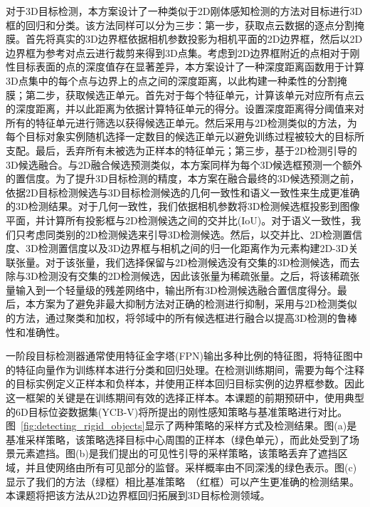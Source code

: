 \documentclass[12pt]{article}
\begin{document}
对于3D目标检测，本方案设计了一种类似于2D刚体感知检测的方法对目标进行3D框的回归和分类。该方法同样可以分为三步：第一步，获取点云数据的逐点分割掩膜。首先将真实的3D边界框依据相机参数投影为相机平面的2D边界框，然后以2D边界框为参考对点云进行裁剪来得到3D点集。考虑到2D边界框附近的点相对于刚性目标表面的点的深度值存在显著差异，本方案设计了一种深度距离函数用于计算3D点集中的每个点与边界上的点之间的深度距离，以此构建一种柔性的分割掩膜；第二步，获取候选正单元。首先对于每个特征单元，计算该单元对应所有点云的深度距离，并以此距离为依据计算特征单元的得分。设置深度距离得分阈值来对所有的特征单元进行筛选以获得候选正单元。然后采用与2D检测类似的方法，为每个目标对象实例随机选择一定数目的候选正单元以避免训练过程被较大的目标所支配。最后，丢弃所有未被选为正样本的特征单元；第三步，基于2D检测引导的3D候选融合。与2D融合候选预测类似，本方案同样为每个3D候选框预测一个额外的置信度。为了提升3D目标检测的精度，本方案在融合最终的3D候选预测之前，依据2D目标检测候选与3D目标检测候选的几何一致性和语义一致性来生成更准确的3D检测结果。对于几何一致性，我们依据相机参数将3D检测候选框投影到图像平面，并计算所有投影框与2D检测候选之间的交并比(IoU)。对于语义一致性，我们只考虑同类别的2D检测候选来引导3D检测候选。然后，以交并比、2D检测置信度、3D检测置信度以及3D边界框与相机之间的归一化距离作为元素构建2D-3D关联张量。对于该张量，我们选择保留与2D检测候选没有交集的3D检测候选，而去除与3D检测没有交集的2D检测候选，因此该张量为稀疏张量。之后，将该稀疏张量输入到一个轻量级的残差网络中，输出所有3D检测候选融合置信度得分。最后，本方案为了避免非最大抑制方法对正确的检测进行抑制，采用与2D检测类似的方法，通过聚类和加权，将邻域中的所有候选框进行融合以提高3D检测的鲁棒性和准确性。




一阶段目标检测器通常使用特征金字塔(FPN)输出多种比例的特征图，将特征图中的特征向量作为训练样本进行分类和回归处理。在检测训练期间，需要为每个注释的目标实例定义正样本和负样本，并使用正样本回归目标实例的边界框参数。因此这一框架的关键是在训练期间有效的选择正样本。本课题的前期预研中，使用典型的6D目标位姿数据集(YCB-V)将所提出的刚性感知策略与基准策略进行对比。图~\ref{fig:detecting_rigid_objects}显示了两种策略的采样方式及检测结果。图(a)是基准采样策略，该策略选择目标中心周围的正样本（绿色单元），而此处受到了场景元素遮挡。图(b)是我们提出的可见性引导的采样策略，该策略丢弃了遮挡区域，并且使网络由所有可见部分的监督。采样概率由不同深浅的绿色表示。图(c)显示了我们的方法（绿框）相比基准策略~\cite{Zhang2020}（红框）可以产生更准确的检测结果。本课题将把该方法从2D边界框回归拓展到3D目标检测领域。
\end{document}
